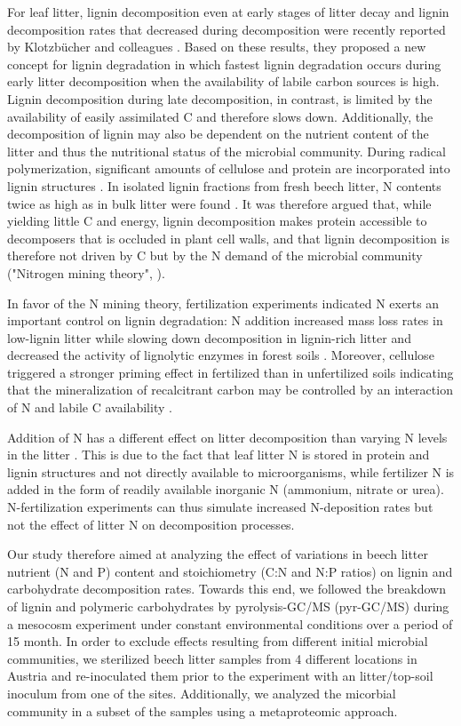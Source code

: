 For leaf litter, lignin decomposition even at early stages of litter decay and lignin decomposition rates that decreased during decomposition were recently reported by Klotzb\"{u}cher and colleagues \cite{Klotzbucher2011}. Based on these results, they proposed a new concept for lignin degradation in which fastest lignin degradation occurs during early litter decomposition when the availability of labile carbon sources is high. Lignin decomposition during late decomposition, in contrast, is limited by the availability of easily assimilated C and therefore slows down. Additionally, the decomposition of lignin may also be dependent on the nutrient content of the litter and thus the nutritional status of the microbial community. During radical polymerization, significant amounts of cellulose and protein are incorporated into lignin structures \cite{Achyuthan2010}. In isolated lignin fractions from fresh beech litter, N contents twice as high as in bulk litter were found \cite{Dyckmans2002}. It was therefore argued that, while yielding little C and energy, lignin decomposition makes protein accessible to decomposers that is occluded in plant cell walls, and that lignin decomposition is therefore not driven by C but by the N demand of the microbial community ("Nitrogen mining theory", \cite{Craine2007}). 

In favor of the N mining theory, fertilization experiments indicated N exerts an important control on lignin degradation: N addition increased mass loss rates in low-lignin litter while slowing down decomposition in lignin-rich litter \cite{Knorr2005} and decreased the activity of lignolytic enzymes in forest soils \cite{Sinsabaugh2010}. Moreover, cellulose triggered a stronger priming effect in fertilized than in unfertilized soils indicating that the mineralization of recalcitrant carbon may be controlled by an interaction of N and labile C availability \cite{Fontaine2011}.

Addition of N has a different effect on litter decomposition than varying N levels in the litter \cite{Talbot2011}. This is due to the fact that leaf litter N is stored in protein and lignin structures and not directly available to microorganisms, while fertilizer N is added in the form of readily available inorganic N (ammonium, nitrate or urea). N-fertilization experiments can thus simulate increased N-deposition rates but not the effect of litter N on decomposition processes.

Our study therefore aimed at analyzing the effect of variations in beech litter nutrient (N and P) content and stoichiometry (C:N and N:P ratios) on lignin and carbohydrate decomposition rates. Towards this end, we followed the breakdown of lignin and polymeric carbohydrates by pyrolysis-GC/MS (pyr-GC/MS) during a mesocosm experiment under constant environmental conditions over a period of 15 month. In order to exclude effects resulting from different initial microbial communities, we sterilized beech litter samples from 4 different locations in Austria and re-inoculated them prior to the experiment with an litter/top-soil inoculum from one of the sites.  
Additionally, we analyzed the micorbial community in a subset of the samples using a metaproteomic approach.

